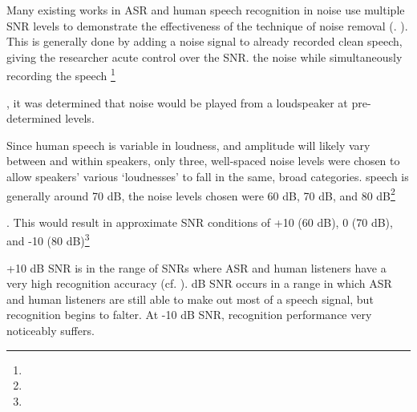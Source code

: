 Many existing works in ASR and human speech recognition in noise use multiple SNR levels to demonstrate the effectiveness of the technique of noise removal (\DIFdelbegin {}\DIFdelend \DIFaddbegin {}\DIFaddend . \cite{braun:16}).  This is generally done by adding a noise signal to already recorded clean speech, giving the researcher acute control over the SNR.  \DIFdelbegin {}\DIFdelend \DIFaddbegin {}\DIFaddend the noise while simultaneously recording the speech \DIFdelbegin \footnote{}%
\addtocounter{footnote}{-1}%
\DIFdelend \DIFaddbegin {}\DIFaddend , it was determined that noise would be played from a loudspeaker at pre-determined \DIFdelbegin {}\DIFdelend \DIFaddbegin {}\DIFaddend levels.  

Since human speech is variable in loudness, and amplitude will likely vary between and within speakers, only three, well-spaced noise levels were chosen to allow speakers' various `loudnesses' to fall in the same, broad categories.  \DIFdelbegin {}\DIFdelend \DIFaddbegin {}\DIFaddend speech is generally around 70 dB, \DIFaddbegin {}\DIFaddend the noise levels chosen were 60 dB, 70 dB, and 80 dB\DIFdelbegin \footnote{}%
\addtocounter{footnote}{-1}%
\DIFdelend \DIFaddbegin {}\DIFaddend .  This would result in approximate SNR conditions of +10 (60 dB), 0 (70 dB), and -10 (80 dB)\DIFdelbegin \footnote{}%
\addtocounter{footnote}{-1}%
\DIFdelend \DIFaddbegin {}\DIFaddend +10 dB SNR is in the range of SNRs where ASR and human listeners have a very high recognition accuracy (cf. \cite{braun:16,gilbert:13}).  \DIFaddbegin {} dB SNR occurs in a range in which ASR and human listeners are still able to make out most of a speech signal, but recognition begins to falter.  At -10 dB SNR, recognition performance very noticeably suffers.  \DIFaddbegin {}\DIFaddend 

